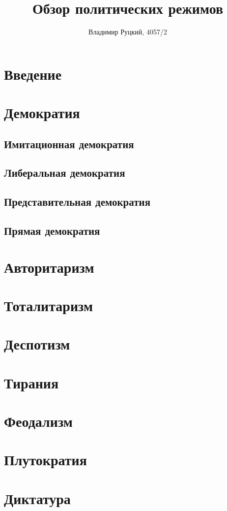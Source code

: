 \documentclass[a4paper,12pt,titlepage]{report}
\title{Обзор политических режимов}
\author{Владимир Руцкий, 4057/2}
\begin{document}
\maketitle

\section*{Введение}
\section*{Демократия}
\subsection*{Имитационная демократия}
\subsection*{Либеральная демократия}
\subsection*{Представительная демократия}
\subsection*{Прямая демократия}

\section*{Авторитаризм}
\section*{Тоталитаризм}

\section*{Деспотизм}
\section*{Тирания}
\section*{Феодализм}
\section*{Плутократия}
\section*{Диктатура}
\end{document}
